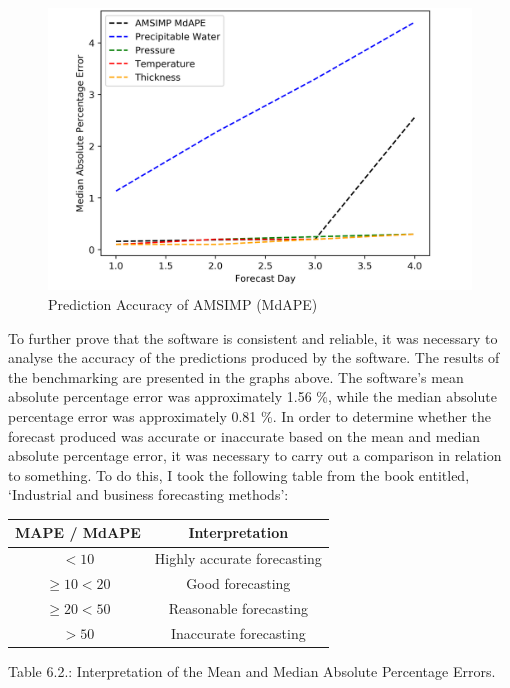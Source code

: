 \begin{figure}[H]
    \centering
    \includegraphics[width=.8\linewidth]{Graphs/mdape_graph.png}
    \caption{Prediction Accuracy of AMSIMP (MdAPE)}
    \label{mdape_accuracy}
\end{figure}

To further prove that the software is consistent and reliable, it was necessary to analyse the accuracy of the predictions produced by the software. The results of the benchmarking are presented in the graphs above. The software's mean absolute percentage error was approximately 1.56 \%, while the median absolute percentage error was approximately 0.81 \%. In order to determine whether the forecast produced was accurate or inaccurate based on the mean and median absolute percentage error, it was necessary to carry out a comparison in relation to something. To do this, I took the following table from the book entitled, `Industrial and business forecasting methods'\cite{mape}:

\hfill

\begin{center}
    \begin{tabular}{|c|c|} 
     \hline
     MAPE / MdAPE & Interpretation \\
     \hline
     $<10$  & Highly accurate forecasting \\
     \hline
     $\geq 10<20 $ & Good forecasting \\
     \hline
     $\geq 20<50 $ & Reasonable forecasting \\
     \hline
     $>50$ & Inaccurate forecasting \\
     \hline
    \end{tabular}\par
    \bigskip
    Table 6.2.: Interpretation of the Mean and Median Absolute Percentage Errors.
\end{center}

